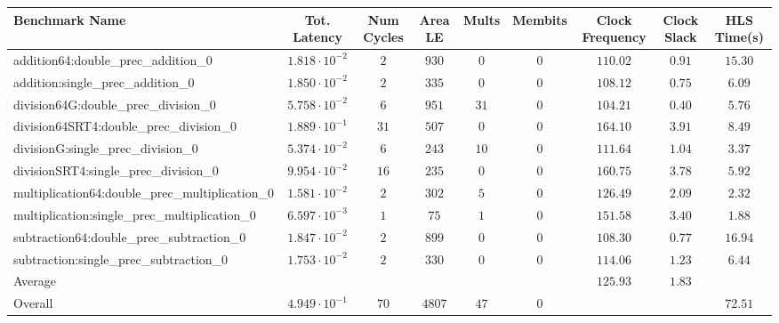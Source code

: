 \begin{tabular}{|l|c|c|c|c|c|c|c|c|}
\hline
Benchmark Name                                   & Tot. Latency            & Num Cycles & Area LE  & Mults  & Membits & Clock Frequency & Clock Slack & HLS Time(s) \\
\hline
addition64:double\_prec\_addition\_0             & $ 1.818 \cdot 10^{-2} $ & $ 2      $ & $ 930  $ & $ 0  $ & $ 0   $ & $ 110.02      $ & $ 0.91    $ & $ 15.30   $ \\
addition:single\_prec\_addition\_0               & $ 1.850 \cdot 10^{-2} $ & $ 2      $ & $ 335  $ & $ 0  $ & $ 0   $ & $ 108.12      $ & $ 0.75    $ & $ 6.09    $ \\
division64G:double\_prec\_division\_0            & $ 5.758 \cdot 10^{-2} $ & $ 6      $ & $ 951  $ & $ 31 $ & $ 0   $ & $ 104.21      $ & $ 0.40    $ & $ 5.76    $ \\
division64SRT4:double\_prec\_division\_0         & $ 1.889 \cdot 10^{-1} $ & $ 31     $ & $ 507  $ & $ 0  $ & $ 0   $ & $ 164.10      $ & $ 3.91    $ & $ 8.49    $ \\
divisionG:single\_prec\_division\_0              & $ 5.374 \cdot 10^{-2} $ & $ 6      $ & $ 243  $ & $ 10 $ & $ 0   $ & $ 111.64      $ & $ 1.04    $ & $ 3.37    $ \\
divisionSRT4:single\_prec\_division\_0           & $ 9.954 \cdot 10^{-2} $ & $ 16     $ & $ 235  $ & $ 0  $ & $ 0   $ & $ 160.75      $ & $ 3.78    $ & $ 5.92    $ \\
multiplication64:double\_prec\_multiplication\_0 & $ 1.581 \cdot 10^{-2} $ & $ 2      $ & $ 302  $ & $ 5  $ & $ 0   $ & $ 126.49      $ & $ 2.09    $ & $ 2.32    $ \\
multiplication:single\_prec\_multiplication\_0   & $ 6.597 \cdot 10^{-3} $ & $ 1      $ & $ 75   $ & $ 1  $ & $ 0   $ & $ 151.58      $ & $ 3.40    $ & $ 1.88    $ \\
subtraction64:double\_prec\_subtraction\_0       & $ 1.847 \cdot 10^{-2} $ & $ 2      $ & $ 899  $ & $ 0  $ & $ 0   $ & $ 108.30      $ & $ 0.77    $ & $ 16.94   $ \\
subtraction:single\_prec\_subtraction\_0         & $ 1.753 \cdot 10^{-2} $ & $ 2      $ & $ 330  $ & $ 0  $ & $ 0   $ & $ 114.06      $ & $ 1.23    $ & $ 6.44    $ \\
\hline
Average                                          & $                     $ & $        $ & $      $ & $    $ & $     $ & $ 125.93      $ & $ 1.83    $ & $         $ \\
\hline
Overall                                          & $ 4.949 \cdot 10^{-1} $ & $ 70     $ & $ 4807 $ & $ 47 $ & $ 0   $ & $             $ & $         $ & $ 72.51   $ \\
\hline
\end{tabular}
